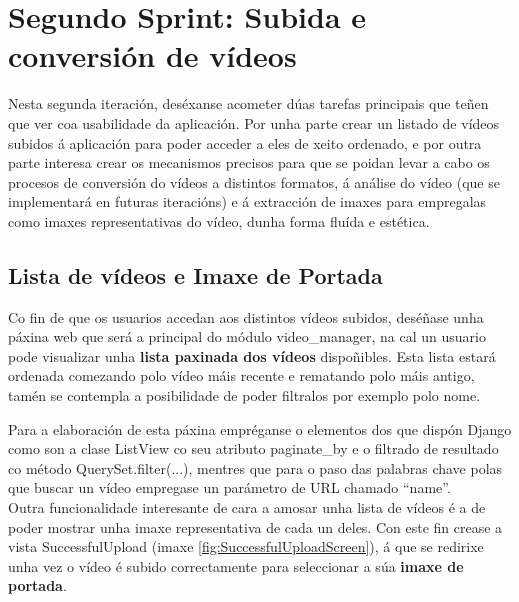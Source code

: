     
\section{Segundo Sprint:  Subida e conversión de vídeos }

    Nesta segunda iteración, deséxanse acometer dúas tarefas principais que teñen que ver coa 
    usabilidade da aplicación. Por unha parte crear un listado de vídeos subidos á aplicación para 
    poder acceder a eles de xeito ordenado, e por outra parte interesa  crear os mecanismos precisos
    para que se poidan levar a cabo os procesos de conversión do vídeos a distintos formatos, 
    á análise do vídeo (que se implementará en futuras iteracións) e á extracción de imaxes para 
    empregalas como imaxes representativas do vídeo, dunha forma fluída e estética.
    
    \subsection{Lista de vídeos e Imaxe de Portada}
        
        Co fin de que os usuarios accedan aos distintos vídeos subidos, deséñase unha páxina web que será a
        principal do módulo video\_manager, na cal un usuario pode visualizar unha \textbf{ lista paxinada dos
        vídeos} dispoñibles. Esta lista estará ordenada comezando polo vídeo máis recente e rematando
        polo máis antigo, tamén se contempla a posibilidade de poder filtralos por exemplo polo nome.
        
        Para a elaboración de esta páxina empréganse o elementos dos que dispón Django como son a
        clase ListView co seu atributo paginate\_by e o filtrado de resultado co método 
        QuerySet.filter(...), mentres que para o paso das palabras chave polas que buscar un vídeo
        empregase un parámetro de URL chamado ``name''.\\
        
        Outra funcionalidade interesante de cara a amosar unha lista de vídeos é a de poder mostrar unha
        imaxe representativa de cada un deles. Con este fin crease a vista SuccessfulUpload (imaxe
        \ref{fig:SuccessfulUploadScreen}), á que se redirixe unha vez o vídeo é subido correctamente
        para seleccionar a súa \textbf{imaxe de portada}.
        
